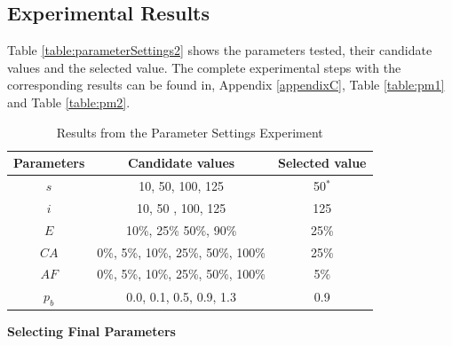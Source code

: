 


\subsection{Experimental Results}
\label{subsec:parameterSettings_results}

Table \vref{table:parameterSettings2} shows the parameters tested, their candidate values and the selected value. The complete experimental steps with the corresponding results can be found in, Appendix \ref{appendixC}, Table \vref{table:pm1} and Table \vref{table:pm2}. 

    \begin{table}[H]
    \centering
    \begin{tabular}{|c|c||c|}
    \hline
    Parameters & Candidate values & Selected value\\
    \hline
    $s$ & 10, 50, 100, 125 & 50$^*$ \\
    $i$ & 10, 50 , 100, 125 & 125\\
    $E$ & 10\%, 25\% 50\%, 90\% & 25\% \\
    $CA$ & 0\%, 5\%, 10\%, 25\%, 50\%, 100\% & 25\% \\
    $AF$ & 0\%, 5\%, 10\%, 25\%, 50\%, 100\% & 5\% \\
    $p_{b}$ & 0.0, 0.1, 0.5, 0.9, 1.3 & 0.9 \\
    \hline
    \end{tabular}
    \caption {Results from the Parameter Settings Experiment}
    \label{table:parameterSettings2}
    \end{table}
    
\textbf{Selecting Final Parameters}
\newline

